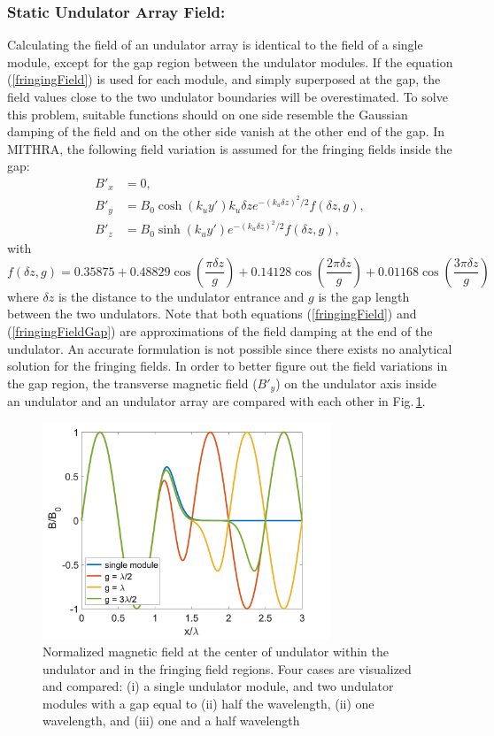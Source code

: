 \subsubsection{Static Undulator Array Field:}

Calculating the field of an undulator array is identical to the field of a single module, except for the gap region between the undulator modules.
%
If the equation (\ref{fringingField}) is used for each module, and simply superposed at the gap, the field values close to the two undulator boundaries will be overestimated.
%
To solve this problem, suitable functions should on one side resemble the Gaussian damping of the field and on the other side vanish at the other end of the gap.
%
In MITHRA, the following field variation is assumed for the fringing fields inside the gap:
%
\begin{align}
B'_x & = 0, \nonumber \\
B'_y & = B_0 \cosh(k_uy')k_u\delta z e^{-(k_u \delta z)^2/2} f(\delta z,g), \label{fringingFieldGap} \\
B'_z & = B_0 \sinh(k_uy') e^{-(k_u \delta z)^2/2} f(\delta z,g), \nonumber
\end{align}
%
with
%
\begin{equation}
f(\delta z, g) = 0.35875 + 0.48829 \cos( \frac{\pi \delta z}{g} ) + 0.14128 \cos( \frac{2 \pi \delta z}{g} ) + 0.01168 \cos( \frac{3 \pi \delta z}{g} )
\end{equation}
%
where $\delta z$ is the distance to the undulator entrance and $g$ is the gap length between the two undulators.
%
Note that both equations (\ref{fringingField}) and (\ref{fringingFieldGap}) are approximations of the field damping at the end of the undulator.
%
An accurate formulation is not possible since there exists no analytical solution for the fringing fields.
%
In order to better figure out the field variations in the gap region, the transverse magnetic field ($B'_y$) on the undulator axis inside an undulator and an undulator array are compared with each other in Fig.\,\ref{FDTDPICFig4}.
%
\begin{figure}
	\centering
	\includegraphics[width=3.4in]{./MITHRA_FDTDPIC/Fig4/Fig4.pdf}
	\caption{Normalized magnetic field at the center of undulator within the undulator and in the fringing field regions. Four cases are visualized and compared: (i) a single undulator module, and two undulator modules with a gap equal to (ii) half the wavelength, (ii) one wavelength, and (iii) one and a half wavelength}
	\label{FDTDPICFig4}
\end{figure}


